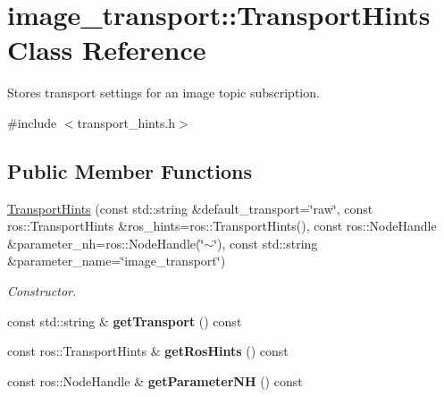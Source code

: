 \hypertarget{classimage__transport_1_1_transport_hints}{\section{image\-\_\-transport\-:\-:Transport\-Hints Class Reference}
\label{classimage__transport_1_1_transport_hints}
}


Stores transport settings for an image topic subscription.  




{\ttfamily \#include $<$transport\-\_\-hints.\-h$>$}

\subsection*{Public Member Functions}
\begin{DoxyCompactItemize}
\item 
\hyperlink{classimage__transport_1_1_transport_hints_a1685aa1484249c2a4f70d91a2eac470a}{Transport\-Hints} (const std\-::string \&default\-\_\-transport=\char`\"{}raw\char`\"{}, const ros\-::\-Transport\-Hints \&ros\-\_\-hints=ros\-::\-Transport\-Hints(), const ros\-::\-Node\-Handle \&parameter\-\_\-nh=ros\-::\-Node\-Handle(\char`\"{}$\sim$\char`\"{}), const std\-::string \&parameter\-\_\-name=\char`\"{}image\-\_\-transport\char`\"{})
\begin{DoxyCompactList}\small\item\em Constructor. \end{DoxyCompactList}\item 
\hypertarget{classimage__transport_1_1_transport_hints_a03ac9b94b5d821ad58069de46750429f}{const std\-::string \& {\bfseries get\-Transport} () const }\label{classimage__transport_1_1_transport_hints_a03ac9b94b5d821ad58069de46750429f}

\item 
\hypertarget{classimage__transport_1_1_transport_hints_a69b2353e24790b8e3e25aaa5b7c2ae2c}{const ros\-::\-Transport\-Hints \& {\bfseries get\-Ros\-Hints} () const }\label{classimage__transport_1_1_transport_hints_a69b2353e24790b8e3e25aaa5b7c2ae2c}

\item 
\hypertarget{classimage__transport_1_1_transport_hints_a6f4f312029db188135e83edd7508cfbd}{const ros\-::\-Node\-Handle \& {\bfseries get\-Parameter\-N\-H} () const }\label{classimage__transport_1_1_transport_hints_a6f4f312029db188135e83edd7508cfbd}

\end{DoxyCompactItemize}


